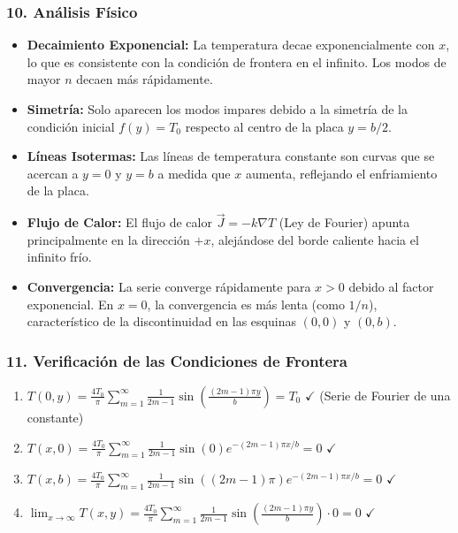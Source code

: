 \documentclass[a4paper]{article}
\begin{document}
\subsubsection{10. Análisis Físico}

\begin{itemize}
    \item \textbf{Decaimiento Exponencial:} La temperatura decae exponencialmente con $x$, lo que es consistente con la condición de frontera en el infinito. Los modos de mayor $n$ decaen más rápidamente.
    
    \item \textbf{Simetría:} Solo aparecen los modos impares debido a la simetría de la condición inicial $f(y) = T_0$ respecto al centro de la placa $y = b/2$.
    
    \item \textbf{Líneas Isotermas:} Las líneas de temperatura constante son curvas que se acercan a $y = 0$ y $y = b$ a medida que $x$ aumenta, reflejando el enfriamiento de la placa.
    
    \item \textbf{Flujo de Calor:} El flujo de calor $\vec{J} = -k\nabla T$ (Ley de Fourier) apunta principalmente en la dirección $+x$, alejándose del borde caliente hacia el infinito frío.
    
    \item \textbf{Convergencia:} La serie converge rápidamente para $x > 0$ debido al factor exponencial. En $x = 0$, la convergencia es más lenta (como $1/n$), característico de la discontinuidad en las esquinas $(0,0)$ y $(0,b)$.
\end{itemize}

\subsubsection{11. Verificación de las Condiciones de Frontera}

\begin{enumerate}
    \item $T(0, y) = \frac{4T_0}{\pi} \sum_{m=1}^{\infty} \frac{1}{2m-1} \sin\left(\frac{(2m-1)\pi y}{b}\right) = T_0$ $\checkmark$ (Serie de Fourier de una constante)
    
    \item $T(x, 0) = \frac{4T_0}{\pi} \sum_{m=1}^{\infty} \frac{1}{2m-1} \sin(0) e^{-(2m-1)\pi x/b} = 0$ $\checkmark$
    
    \item $T(x, b) = \frac{4T_0}{\pi} \sum_{m=1}^{\infty} \frac{1}{2m-1} \sin((2m-1)\pi) e^{-(2m-1)\pi x/b} = 0$ $\checkmark$
    
    \item $\lim_{x \to \infty} T(x, y) = \frac{4T_0}{\pi} \sum_{m=1}^{\infty} \frac{1}{2m-1} \sin\left(\frac{(2m-1)\pi y}{b}\right) \cdot 0 = 0$ $\checkmark$
\end{enumerate}
\end{document}
